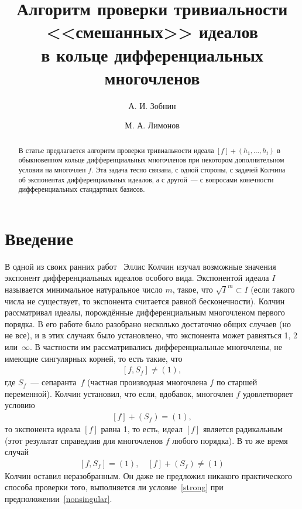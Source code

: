 \documentclass[11pt]{article}
\title{Алгоритм проверки тривиальности <<смешанных>> идеалов\\ в кольце дифференциальных многочленов}
\author{А. И. Зобнин \and М. А. Лимонов}
\theoremstyle{plain1}
\theoremstyle{plain2}
\theoremstyle{plain}
\theoremstyle{plain3}
\theoremstyle{definition}
\theoremstyle{remark}
\begin{document}
\maketitle

\begin{abstract}
В статье предлагается алгоритм проверки тривиальности идеала
$[f] + (h_1, \ldots, h_t)$ в обыкновенном кольце дифференциальных многочленов
при некотором дополнительном условии на многочлен $f$.
Эта задача тесно связана, с одной стороны, с задачей Колчина об экспонентах дифференциальных идеалов,
а с другой~--- с вопросами конечности дифференциальных стандартных базисов.
\end{abstract}

\section{Введение}

В одной из своих ранних работ~\cite{Kolchin41} Эллис Колчин изучал возможные значения экспонент дифференциальных идеалов особого вида.
Экспонентой идеала $I$ называется минимальное натуральное число $m$, такое, что $\sqrt{I}^m\subset I$ (если такого числа не существует,
то экспонента считается равной бесконечности).
Колчин рассматривал идеалы, порождённые дифференциальным многочленом первого порядка.
В его работе было разобрано несколько достаточно общих случаев (но не все), и в этих случаях было установлено, что экспонента может равняться 1, 2 или~$\infty$.
В частности им рассматривались дифференциальные многочлены, не имеющие сингулярных корней, то есть такие, что
\begin{gather}
\label{nonsingular}
[f,S_f]\ne(1),
\end{gather}
где $S_f$~--- сепаранта~$f$ (частная производная многочлена $f$ по старшей переменной).
Колчин установил, что если, вдобавок, многочлен $f$ удовлетворяет условию
\begin{gather}
\label{strong}
[f]+(S_f)=(1),
\end{gather}
то экспонента идеала $[f]$ равна 1, то есть, идеал $[f]$ является радикальным (этот результат справедлив для многочленов $f$ любого порядка).
В то же время случай
\begin{gather}
\label{nontrivial}
[f, S_f] = (1), \quad [f] + (S_f) \ne (1)
\end{gather}
Колчин оставил неразобранным. Он даже не предложил никакого практического способа проверки того,
выполняется ли условие~\eqref{strong} при предположении~\eqref{nonsingular}.
\end{document}
